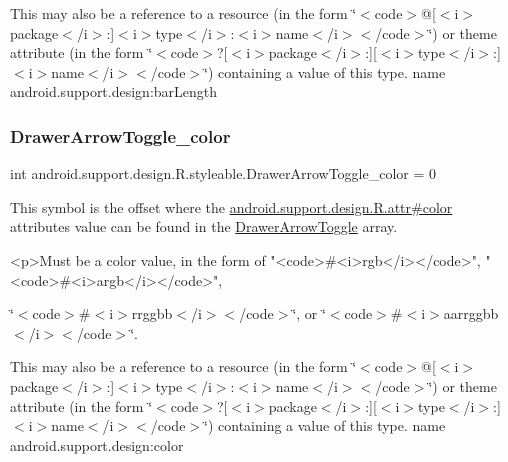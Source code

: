 This may also be a reference to a resource (in the form \char`\"{}$<$code$>$@\mbox{[}$<$i$>$package$<$/i$>$\+:\mbox{]}$<$i$>$type$<$/i$>$\+:$<$i$>$name$<$/i$>$$<$/code$>$\char`\"{}) or theme attribute (in the form \char`\"{}$<$code$>$?\mbox{[}$<$i$>$package$<$/i$>$\+:\mbox{]}\mbox{[}$<$i$>$type$<$/i$>$\+:\mbox{]}$<$i$>$name$<$/i$>$$<$/code$>$\char`\"{}) containing a value of this type.  name android.\+support.\+design\+:bar\+Length \mbox{\label{classandroid_1_1support_1_1design_1_1R_1_1styleable_a95f1e87753ba4cd62fef03f1b2635ba1}} 
\subsubsection{\texorpdfstring{Drawer\+Arrow\+Toggle\+\_\+color}{DrawerArrowToggle\_color}}
{\footnotesize\ttfamily int android.\+support.\+design.\+R.\+styleable.\+Drawer\+Arrow\+Toggle\+\_\+color = 0\hspace{0.3cm}{\ttfamily [static]}}

This symbol is the offset where the \hyperlink{classandroid_1_1support_1_1design_1_1R_1_1attr_ac4692721eae257ed767bb464917446de}{android.\+support.\+design.\+R.\+attr\#color} attribute\textquotesingle{}s value can be found in the \hyperlink{classandroid_1_1support_1_1design_1_1R_1_1styleable_a559d22c78738e5161420dc4b41689c1b}{Drawer\+Arrow\+Toggle} array.

\begin{DoxyVerb}      <p>Must be a color value, in the form of "<code>#<i>rgb</i></code>", "<code>#<i>argb</i></code>",
\end{DoxyVerb}
 \char`\"{}$<$code$>$\#$<$i$>$rrggbb$<$/i$>$$<$/code$>$\char`\"{}, or \char`\"{}$<$code$>$\#$<$i$>$aarrggbb$<$/i$>$$<$/code$>$\char`\"{}. 

This may also be a reference to a resource (in the form \char`\"{}$<$code$>$@\mbox{[}$<$i$>$package$<$/i$>$\+:\mbox{]}$<$i$>$type$<$/i$>$\+:$<$i$>$name$<$/i$>$$<$/code$>$\char`\"{}) or theme attribute (in the form \char`\"{}$<$code$>$?\mbox{[}$<$i$>$package$<$/i$>$\+:\mbox{]}\mbox{[}$<$i$>$type$<$/i$>$\+:\mbox{]}$<$i$>$name$<$/i$>$$<$/code$>$\char`\"{}) containing a value of this type.  name android.\+support.\+design\+:color \mbox{\label{classandroid_1_1support_1_1design_1_1R_1_1styleable_aa82a02d1c0ba82c43692ec349fddcea0}} 
